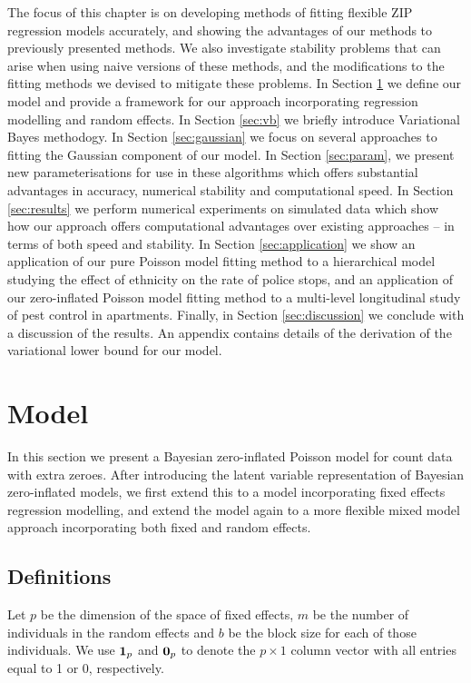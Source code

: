 \documentclass{amsart}[12pt]
\begin{document}
The focus of this chapter is on developing methods of fitting flexible ZIP regression models accurately, and
showing the advantages of our methods to previously presented methods. We also investigate stability problems
that can arise when using naive versions of these methods, and the modifications to the fitting methods we
devised to mitigate these problems. In Section \ref{sec:model} we define our model and provide a framework for
our approach incorporating regression modelling and random effects. In Section \ref{sec:vb} we briefly
introduce Variational Bayes methodogy. In Section \ref{sec:gaussian} we focus on several approaches to fitting
the Gaussian component of our model. In Section \ref{sec:param}, we present new parameterisations for use in
these algorithms which offers substantial advantages in accuracy, numerical stability and computational speed.
In Section \ref{sec:results} we perform numerical experiments on simulated data which show how our approach
offers computational advantages over existing approaches -- in terms of both speed and stability. In Section
\ref{sec:application} we show an application of our pure Poisson model fitting method to a hierarchical model
studying the effect of ethnicity on the rate of police stops, and an application of our zero-inflated Poisson
model fitting method to a multi-level longitudinal study of pest control in apartments. Finally, in Section
\ref{sec:discussion} we conclude with a discussion of the results. An appendix contains details of the
derivation of the variational lower bound for our model.

\section{Model}
\label{sec:model}

In this section we present a Bayesian zero-inflated Poisson model for count data with extra zeroes. After
introducing the latent variable representation of Bayesian zero-inflated models, we first extend this to
a model incorporating fixed effects regression modelling, and extend the model again to a more flexible mixed 
model approach incorporating both fixed and random effects.

\subsection{Definitions}

Let $p$ be the dimension of the space of fixed effects, $m$ be the number of individuals in the random effects
and $b$ be the block size for each of those individuals. We use ${\bf 1}_p$ and ${\bf 0}_p$ to denote the $p
\times 1$ column vector with all entries equal to 1 or 0, respectively.
\end{document}

